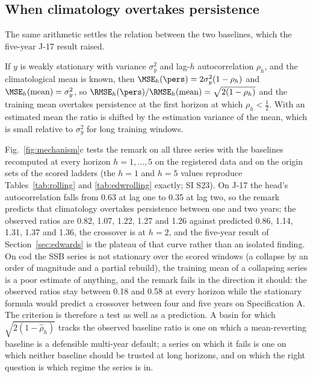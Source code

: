 \subsection{When climatology overtakes persistence}\label{sec:crossover}

The same arithmetic settles the relation between the two baselines, which the five-year J-17 result raised.

\begin{remark}\label{rem:crossover}
If $y$ is weakly stationary with variance $\sigma_y^2$ and lag-$h$ autocorrelation $\rho_h$, and the climatological mean is known, then $\MSE_h(\pers)=2\sigma_y^2(1-\rho_h)$ and $\MSE_h(\mathrm{mean})=\sigma_y^2$, so $\RMSE_h(\pers)/\RMSE_h(\mathrm{mean})=\sqrt{2(1-\rho_h)}$ and the training mean overtakes persistence at the first horizon at which $\rho_h<\tfrac12$. With an estimated mean the ratio is shifted by the estimation variance of the mean, which is small relative to $\sigma_y^2$ for long training windows.
\end{remark}

Fig.~\ref{fig:mechanism}c tests the remark on all three series with the baselines recomputed at every horizon $h=1,\dots,5$ on the registered data and on the origin sets of the scored ladders (the $h=1$ and $h=5$ values reproduce Tables~\ref{tab:rolling} and \ref{tab:edwrolling} exactly; SI S23). On J-17 the head's autocorrelation falls from 0.63 at lag one to 0.35 at lag two, so the remark predicts that climatology overtakes persistence between one and two years; the observed ratios are 0.82, 1.07, 1.22, 1.27 and 1.26 against predicted 0.86, 1.14, 1.31, 1.37 and 1.36, the crossover is at $h=2$, and the five-year result of Section~\ref{sec:edwards} is the plateau of that curve rather than an isolated finding. On cod the SSB series is not stationary over the scored windows (a collapse by an order of magnitude and a partial rebuild), the training mean of a collapsing series is a poor estimate of anything, and the remark fails in the direction it should: the observed ratios stay between 0.18 and 0.58 at every horizon while the stationary formula would predict a crossover between four and five years on Specification A. The criterion is therefore a test as well as a prediction. A basin for which $\sqrt{2(1-\hat\rho_h)}$ tracks the observed baseline ratio is one on which a mean-reverting baseline is a defensible multi-year default; a series on which it fails is one on which neither baseline should be trusted at long horizons, and on which the right question is which regime the series is in.

